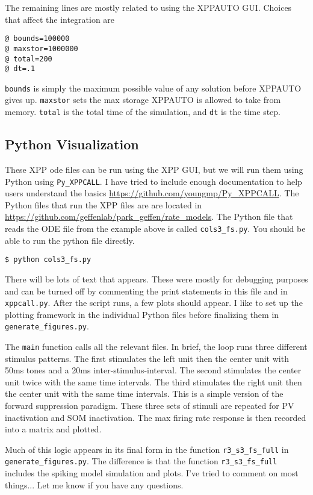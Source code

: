 \documentclass[a4paper,10pt]{article}
\newcommand{\y}[1]{{\texttt{#1}}}
\begin{document}
The remaining lines are mostly related to using the XPPAUTO GUI. Choices that affect the integration are
\begin{verbatim}
@ bounds=100000
@ maxstor=1000000
@ total=200
@ dt=.1
\end{verbatim}
\y{bounds} is simply the maximum possible value of any solution before XPPAUTO gives up. \y{maxstor} sets the max storage XPPAUTO is allowed to take from memory. \y{total} is the total time of the simulation, and \y{dt} is the time step.

\subsection{Python Visualization}
These XPP ode files can be run using the XPP GUI, but we will run them using Python using \y{Py\_XPPCALL}. I have tried to include enough documentation to help users understand the basics \url{https://github.com/youngmp/Py_XPPCALL}. The Python files that run the XPP files are are located in \url{https://github.com/geffenlab/park_geffen/rate_models}. The Python file that reads the ODE file from the example above is called \y{cols3\_fs.py}. You should be able to run the python file directly.
\begin{verbatim}
$ python cols3_fs.py
\end{verbatim}
There will be lots of text that appears. These were mostly for debugging purposes and can be turned off by commenting the print statements in this file and in \y{xppcall.py}. After the script runs, a few plots should appear. I like to set up the plotting framework in the individual Python files before finalizing them in \y{generate\_figures.py}.

The \y{main} function calls all the relevant files. In brief, the loop runs three different stimulus patterns. The first stimulates the left unit then the center unit with 50ms tones and a 20ms inter-stimulus-interval. The second stimulates the center unit twice with the same time intervals. The third stimulates the right unit then the center unit with the same time intervals. This is a simple version of the forward suppression paradigm. These three sets of stimuli are repeated for PV inactivation and SOM inactivation. The max firing rate response is then recorded into a matrix and plotted.

Much of this logic appears in its final form in the function \y{r3\_s3\_fs\_full} in \y{generate\_figures.py}. The difference is that the function \y{r3\_s3\_fs\_full} includes the spiking model simulation and plots. I've tried to comment on most things... Let me know if you have any questions.
\end{document}
